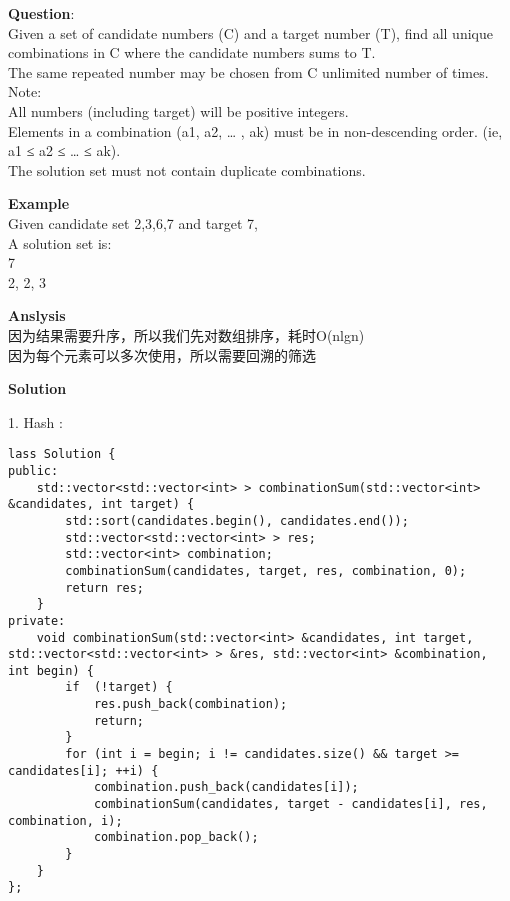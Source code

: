     
\begin{description}
    \item{\textbf{Question}}:\\%
		Given a set of candidate numbers (C) and a target number (T), find all unique combinations in C where the candidate numbers sums to T.\\
		The same repeated number may be chosen from C unlimited number of times.\\
		Note:\\
		All numbers (including target) will be positive integers.\\
		Elements in a combination (a1, a2, … , ak) must be in non-descending order. (ie, a1 ≤ a2 ≤ … ≤ ak).\\
		The solution set must not contain duplicate combinations.\\


    \item{\textbf{Example}}\\
		Given candidate set 2,3,6,7 and target 7, \\
		A solution set is: \\
		{7}\\
		{2, 2, 3}\\

    \item{\textbf{Anslysis}}\\
		因为结果需要升序，所以我们先对数组排序，耗时O(nlgn)\\
		因为每个元素可以多次使用，所以需要回溯的筛选\\

    \item{\textbf{Solution}}\\
	\item{1. Hash} : \\
		\begin{lstlisting}
lass Solution {
public:
    std::vector<std::vector<int> > combinationSum(std::vector<int> &candidates, int target) {
        std::sort(candidates.begin(), candidates.end());
        std::vector<std::vector<int> > res;
        std::vector<int> combination;
        combinationSum(candidates, target, res, combination, 0);
        return res;
    }
private:
    void combinationSum(std::vector<int> &candidates, int target, std::vector<std::vector<int> > &res, std::vector<int> &combination, int begin) {
        if  (!target) {
            res.push_back(combination);
            return;
        }
        for (int i = begin; i != candidates.size() && target >= candidates[i]; ++i) {
            combination.push_back(candidates[i]);
            combinationSum(candidates, target - candidates[i], res, combination, i);
            combination.pop_back();
        }
    }
};		\end{lstlisting}

\end{description}

